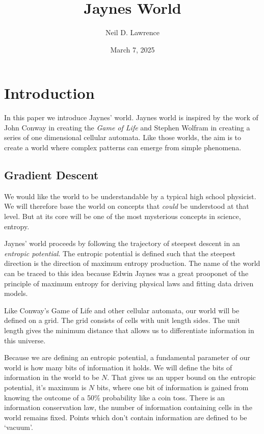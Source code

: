 \documentclass[11pt,a4paper]{article}
\title{\LARGE \textbf{Jaynes World}}
\author{Neil D. Lawrence}
\date{March 7, 2025}
\begin{document}
\maketitle

\begin{abstract}
\end{abstract}

\section{Introduction}

In this paper we introduce Jaynes' world. Jaynes world is inspired by the work of John Conway in creating the \emph{Game of Life} and Stephen Wolfram in creating a series of one dimensional cellular automata. Like those worlds, the aim is to create a world where complex patterns can emerge from simple phenomena. 

\subsection{Gradient Descent}

We would like the world to be understandable by a typical high school physicist. We will therefore base the world on concepts that \emph{could} be understood at that level. But at its core will be one of the most mysterious concepts in science, entropy. 

Jaynes' world proceeds by following the trajectory of steepest descent in an \emph{entropic potential}. The entropic potential is defined such that the steepest direction is the direction of maximum entropy production. The name of the world can be traced to this idea because Edwin Jaynes was a great prooponet of the principle of maximum entropy for deriving physical laws and fitting data driven models. 

Like Conway's Game of Life and other cellular automata, our world will be defined on a grid. The grid consists of cells with unit length sides. The unit length gives the minimum distance that allows us to differentiate information in this universe. 

Because we are defining an entropic potential, a fundamental parameter of our world is how many bits of information it holds. We will define the bits of information in the world to be $N$. That gives us an upper bound on the entropic potential, it's maximum is $N$ bits, where one bit of information is gained from knowing the outcome of a 50\% probability like a coin toss. There is an information conservation law, the number of information containing cells in the world remains fixed. Points which don't contain information are defined to be `vacuum'. 
\end{document}
